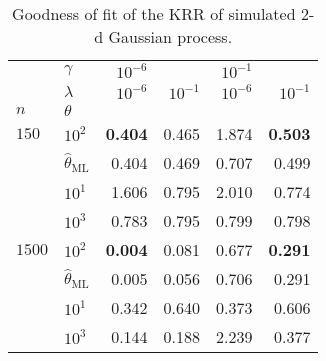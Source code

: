 \documentclass[a4paper,14pt]{extarticle}
\begin{document}
\begin{table}
  \centering
  \caption{Goodness of fit of the KRR of simulated $2$-d Gaussian process.}
  \label{tab:gaussian_2d_rmse_std}
  \begin{tabular}{ll||rr|rr}
  \toprule
       & $\gamma$ & $10^{-6}$ &          & $10^{-1}$ &          \\\cline{2-2}
       & $\lambda$ & $10^{-6}$ & $10^{-1}$ & $10^{-6}$ & $10^{-1}$ \\\cline{2-2}
  $n$ & $\theta$ &          &          &          &          \\
  \midrule
  $150$  & $10^2$ &    \textbf{0.404} &    0.465 &    1.874 &    \textbf{0.503} \\
       & $\hat{\theta}_\text{ML}$ &    0.404 &    0.469 &    0.707 &    0.499 \\\cline{2-6}
       & $10^1$ &    1.606 &    0.795 &    2.010 &    0.774 \\
       & $10^3$ &    0.783 &    0.795 &    0.799 &    0.798 \\%
  \midrule
  $1500$ & $10^2$ &    \textbf{0.004} &    0.081 &    0.677 &    \textbf{0.291} \\
       & $\hat{\theta}_\text{ML}$ &    0.005 &    0.056 &    0.706 &    0.291 \\\cline{2-6}
       & $10^1$ &    0.342 &    0.640 &    0.373 &    0.606 \\
       & $10^3$ &    0.144 &    0.188 &    2.239 &    0.377 \\%
  \bottomrule
  \end{tabular}
\end{table}
\end{document}
